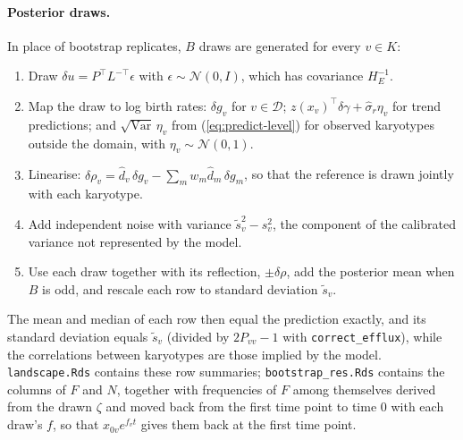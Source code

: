 \documentclass[11pt]{article}
\newcommand{\Normal}{\mathcal{N}}
\begin{document}
\paragraph{Posterior draws.}
In place of bootstrap replicates, $B$ draws are generated for every
$v\in K$:
\begin{enumerate}
\item Draw $\delta u=P^\top L^{-\top}\epsilon$ with
$\epsilon\sim\Normal(0,I)$, which has covariance $H_E^{-1}$.
\item Map the draw to log birth rates: $\delta g_v$ for $v\in\mathcal{D}$;
$z(x_v)^\top\delta\gamma+\hat\sigma_r\eta_v$ for trend predictions; and
$\sqrt{\operatorname{Var}}\,\eta_v$ from (\ref{eq:predict-level}) for observed
karyotypes outside the domain, with $\eta_v\sim\Normal(0,1)$.
\item Linearise:
$\delta\rho_v=\hat d_v\,\delta g_v-\sum_mw_m\hat d_m\,\delta g_m$, so that the
reference is drawn jointly with each karyotype.
\item Add independent noise with variance $\tilde s_v^2-s_v^2$, the component
of the calibrated variance not represented by the model.
\item Use each draw together with its reflection, $\pm\delta\rho$, add the
posterior mean when $B$ is odd, and rescale each row to standard deviation
$\tilde s_v$.
\end{enumerate}
The mean and median of each row then equal the prediction exactly, and its
standard deviation equals $\tilde s_v$ (divided by $2P_{vv}-1$ with
\texttt{correct\_efflux}), while the correlations between
karyotypes are those implied by the model. \texttt{landscape.Rds} contains
these row summaries; \texttt{bootstrap\_res.Rds} contains the columns of $F$
and $N$, together with frequencies of $F$ among themselves derived from the
drawn $\zeta$ and moved back from the first time point to time 0 with each
draw's $f$, so that $x_{0v}e^{f_vt}$ gives them back at the first time point.
\end{document}
